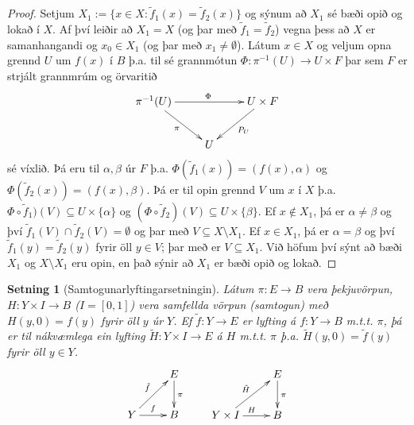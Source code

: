 \documentclass[a4paper,icelandic]{book}
\theoremstyle{definition}
\theoremstyle{plain}
\newtheorem{setn}{Setning}[section]
\theoremstyle{remark}
\begin{document}
\begin{proof}
  Setjum $X_1 := \{ x\in X : \tilde f_1(x) = \tilde f_2(x) \}$ og sýnum
  að $X_1$ sé bæði opið og lokað í $X$. Af því leiðir að $X_1 = X$ (og
  þar með $\tilde f_1 = \tilde f_2$) vegna þess að $X$ er samanhangandi
  og $x_0\in X_1$ (og þar með $x_1\neq\emptyset$).  Látum $x\in X$ og
  veljum opna grennd $U$ um $f(x)$ í $B$ þ.a. til sé grannmótun
  $\Phi:\pi^{-1}(U)\to U\times F$ þar sem $F$ er strjált grannmrúm og
  örvaritið \[\xymatrix{
  \pi^{-1}(U)\ar[rr]^\Phi\ar[dr]_\pi
  && U\times F\ar[dl]^{P_U}
  \\
  &U&
  }\]
  sé víxlið. Þá eru til $\alpha,\beta$ úr $F$ þ.a. $\Phi(\tilde f_1(x))
  = (f(x),\alpha)$ og $\Phi(\tilde f_2(x)) = (f(x),\beta)$. Þá er til
  opin grennd $V$ um $x$ í $X$ þ.a. $\Phi\circ\tilde f_1)(V)\subseteq
  U\times\{\alpha\}$ og $(\Phi\circ\tilde f_2)(V)\subseteq
  U\times\{\beta\}$.  Ef $x\notin X_1$, þá er $\alpha\neq\beta$ og því
  $\tilde f_1(V)\cap\tilde f_2(V) = \emptyset$ og þar með $V\subseteq
  X\setminus X_1$. Ef $x\in X_1$, þá er $\alpha = \beta$ og því
  $\tilde{f}_1(y)=\tilde f_2(y)$ fyrir öll $y\in V$; þar með er
  $V\subseteq X_1$. Við höfum því sýnt að bæði $X_1$ og $X\setminus X_1$
  eru opin, en það sýnir að $X_1$ er bæði opið og lokað.
\end{proof}
\begin{setn}
  [Samtogunarlyftingarsetningin]
  Látum $\pi: E\to B$ vera þekjuvörpun, $H: Y\times I\to B$ ($I=[0,1]$)
  vera samfellda vörpun (samtogun) með $H(y,0) = f(y)$ fyrir öll $y$ úr
  $Y$. Ef $\tilde f:Y\to E$ er lyfting á $f:Y\to B$ m.t.t. $\pi$, þá er
  til nákvæmlega ein lyfting $\tilde H:Y\times I\to E$ á $H$ m.t.t.
  $\pi$ þ.a. $\tilde H(y,0) = \tilde f(y)$ fyrir öll $y\in Y$.
  \[\xymatrix{
  & E\ar[d]^\pi \\
  Y\ar[r]^f\ar[ur]^{\tilde f}
  & B
  }
  \qquad
  \xymatrix{
  &E\ar[d]^\pi\\
  Y\times I\ar[r]^H\ar[ur]^{\tilde H}
  & B
  }\]
\end{setn}
\end{document}

